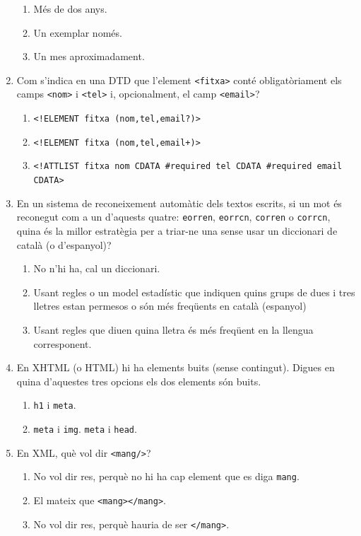 \begin{enumerate}
\begin{enumerate}
\item Més de dos anys.
\item Un exemplar només.
\item Un mes aproximadament.
\end{enumerate}




\item 
   Com s'indica en una DTD que l'element \verb|<fitxa>| conté
   obligatòriament els camps \verb|<nom>| i
   \verb|<tel>| i, opcionalment, el camp \verb|<email>|?
   
\begin{enumerate}
\item \verb|<!ELEMENT fitxa (nom,tel,email?)>|
\item \verb|<!ELEMENT fitxa (nom,tel,email+)>|
\item \verb|<!ATTLIST fitxa nom CDATA #required tel CDATA #required email CDATA>|
\end{enumerate}

\item En un sistema de reconeixement automàtic dels textos escrits,
  si un mot és reconegut com a un d'aquests quatre:
  \verb|eorren|, \verb|eorrcn|, \verb|corren| o
  \verb|corrcn|, quina és la millor estratègia per a triar-ne
  una sense usar un diccionari de català (o d'espanyol)?
  
\begin{enumerate}
\item No n'hi ha, cal un diccionari.
\item Usant regles o un model estadístic que indiquen quins
  grups de dues i tres lletres estan permesos o són més freqüents en
  català (espanyol)
\item Usant regles que diuen quina lletra és més freqüent en la
  llengua corresponent.
\end{enumerate}


\item En XHTML (o HTML) hi ha elements buits (sense contingut). 
Digues en quina d'aquestes tres opcions els dos elements són buits.
\begin{enumerate}
\item \texttt{h1} i \texttt{meta}.
\item \texttt{meta} i \texttt{img}.
\texttt{meta} i \texttt{head}.
\end{enumerate}

\item En XML, què vol dir \texttt{<mang/>}? 
  \begin{enumerate}
  \item No vol dir res, perquè no hi ha cap element que es diga \texttt{mang}.
  \item El mateix que \texttt{<mang></mang>}.
  \item No vol dir res, perquè hauria de ser \texttt{</mang>}.
  \end{enumerate}


\end{enumerate}
